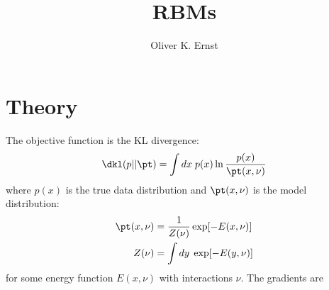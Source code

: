 \documentclass[11pt]{article}
\title{RBMs}
\author{Oliver K. Ernst}
\begin{document}
\maketitle


\section{Theory}



The objective function is the KL divergence:
\begin{equation}
\dkl (p || \pt) = \int dx \; p(x) \ln \frac{p(x)}{\pt(x, \nu)}
\end{equation}
where $p(x)$ is the true data distribution and $\pt(x,\nu)$ is the model distribution:
\begin{equation}
\begin{split}
\pt(x,\nu) &= \frac{1}{Z(\nu)} \exp [ - E(x, \nu) ] \\
Z(\nu) &= \int dy \; \exp [ - E(y, \nu) ]
\end{split}
\end{equation}
for some energy function $E(x,\nu)$ with interactions $\nu$. The gradients are
\end{document}
